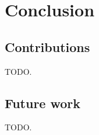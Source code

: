 \chapter*{Conclusion}
\mtcaddchapter[Conclusion]

\section*{Contributions}
TODO.

\section*{Future work}
TODO.
